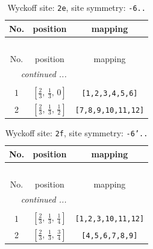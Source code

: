 \documentclass[fleqn,8pt]{jsarticle}
\begin{document}
\begin{longtable}{ccc}
\caption{Wyckoff site: {\tt 2e}, site symmetry: {\tt -6..}}
 \\
 \hline \hline
No. & position & mapping \\ \hline \endfirsthead

\multicolumn{2}{l}{\tablename\ \thetable{}} \\
 \hline \hline
No. & position & mapping \\ \hline \endhead

 \hline \hline
\multicolumn{2}{r}{\footnotesize\it continued ...} \\ \endfoot

 \hline \hline
\multicolumn{2}{r}{} \\ \endlastfoot

1 & $\left[ \frac{2}{3},\, \frac{1}{3},\, 0 \right]$ & {\tt [1,2,3,4,5,6]} \\ \hline
2 & $\left[ \frac{2}{3},\, \frac{1}{3},\, \frac{1}{2} \right]$ & {\tt [7,8,9,10,11,12]} \\
\end{longtable}
\renewcommand{\arraystretch}{1.2}
\begin{longtable}{ccc}
\caption{Wyckoff site: {\tt 2f}, site symmetry: {\tt -6'..}}
 \\
 \hline \hline
No. & position & mapping \\ \hline \endfirsthead

\multicolumn{2}{l}{\tablename\ \thetable{}} \\
 \hline \hline
No. & position & mapping \\ \hline \endhead

 \hline \hline
\multicolumn{2}{r}{\footnotesize\it continued ...} \\ \endfoot

 \hline \hline
\multicolumn{2}{r}{} \\ \endlastfoot

1 & $\left[ \frac{2}{3},\, \frac{1}{3},\, \frac{1}{4} \right]$ & {\tt [1,2,3,10,11,12]} \\ \hline
2 & $\left[ \frac{2}{3},\, \frac{1}{3},\, \frac{3}{4} \right]$ & {\tt [4,5,6,7,8,9]} \\
\end{longtable}
\renewcommand{\arraystretch}{1.2}
\end{document}
